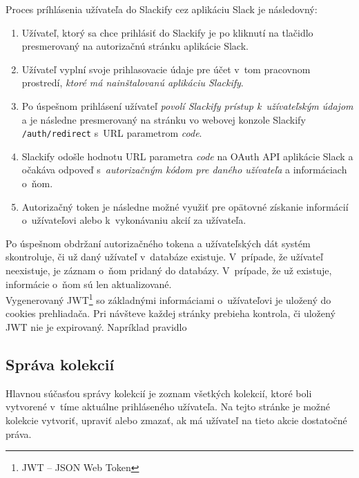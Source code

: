 \noindent Proces príhlásenia užívateľa do Slackify cez aplikáciu Slack je následovný:

\begin{enumerate}
	\item Užívateľ, ktorý sa chce prihlásiť do Slackify je po kliknutí na tlačidlo  presmerovaný na autorizačnú stránku aplikácie Slack.
	\item Užívateľ vyplní svoje prihlasovacie údaje pre účet v~tom pracovnom prostredí, \emph{ktoré má nainštalovanú aplikáciu Slackify}.
	\item Po úspešnom prihlásení užívateľ \emph{povolí Slackify prístup k~užívateľským údajom} a je následne presmerovaný na stránku vo webovej konzole Slackify \texttt{/auth/redirect} s~URL parametrom \textit{code}.
	\item Slackify odošle hodnotu URL parametra \textit{code} na OAuth API aplikácie Slack a očakáva odpoveď s~\emph{autorizačným kódom pre daného užívateľa} a informáciach o~ňom.
	\item Autorizačný token je následne možné využiť pre opätovné získanie informácií o~užívateľovi alebo k~vykonávaniu akcií za užívateľa.
\end{enumerate}

\noindent Po úspešnom obdržaní autorizačného tokena a užívateľských dát systém skontroluje, či už daný užívateľ v~databáze existuje. V~prípade, že užívateľ neexistuje, je záznam o~ňom pridaný do databázy. V~prípade, že už existuje, informácie o~ňom sú len aktualizované. \\

\noindent Vygenerovaný JWT\footnote{JWT -- JSON Web Token} so základnými informáciami o~užívateľovi je uložený do cookies prehliadača. Pri návšteve každej stránky prebieha kontrola, či uložený JWT nie je expirovaný. Napríklad pravidlo 

\subsection{Správa kolekcií}
Hlavnou súčasťou správy kolekcií je zoznam všetkých kolekcií, ktoré boli vytvorené v~tíme aktuálne prihláseného užívateľa. Na tejto stránke je možné kolekcie vytvoriť, upraviť alebo zmazať, ak má užívateľ na tieto akcie dostatočné práva.

